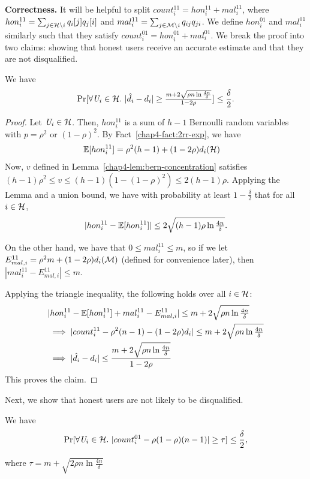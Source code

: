 \noindent \textbf{Correctness.} 
It will be helpful to split $count_i^{11} = hon_i^{11} + mal_i^{11}$, where $hon_i^{11} = \sum_{j \in \mathcal{H} \setminus i} q_{i}[j] q_{j}[i]$ and $mal_i^{11} = \sum_{j \in \mathcal{M} \setminus i} q_{ij} q_{ji}$. We define $hon_i^{01}$ and $mal_i^{01}$ similarly such that they satisfy $count_i^{01} = hon_i^{01} + mal_i^{01}$. We break the proof into two claims: showing that honest users receive an accurate estimate and that they are not disqualified.

\begin{claim}\label{chap4-claim:honest-response-concentration-1} We have
\[
    \Pr[\forall \textit{U}_i \in \mathcal{H}.~|\hat{d}_i - d_i| \geq \tfrac{m + 2 \sqrt{\rho n \ln \frac{4n}{\delta}}}{1-2\rho}] \leq \frac{\delta}{2}.
\]
\end{claim}
\begin{proof} 
Let $\textit{U}_i \in \mathcal{H}$. Then, $hon_i^{11}$ is a sum of $h-1$ Bernoulli random variables with $p = \rho^2$ or $(1-\rho)^2$. By Fact~\ref{chap4-fact:2rr-exp}, we have
\begin{align*}
    \operatorname{\mathbb{E}}[hon_i^{11}] &= \rho^2 (h-1) + (1-2\rho) d_i(\mathcal{H})
\end{align*}
Now, $v$ defined in Lemma~\ref{chap4-lem:bern-concentration} satisfies $(h-1) \rho^2 \leq v \leq (h-1)(1-(1-\rho)^2) \leq 2(h-1)\rho$. Applying the Lemma and a union bound, we have with probability at least $1-\frac{\delta}{2}$ that for all $i \in \mathcal{H}$,
\begin{equation}\label{chap4-eq:hon-player-bits}
    |hon_i^{11} - \operatorname{\mathbb{E}}[hon_i^{11}]| \leq 2\sqrt{(h-1)\rho \ln \tfrac{4n}{\delta}}.
\end{equation}

On the other hand, we have that $0 \leq mal_i^{11} \leq m$, so if we let $E_{mal,i}^{11} = \rho^2 m + (1-2\rho) d_i(\mathcal{M})$ (defined for convenience later), then $|mal_i^{11} - E_{mal,i}^{11}| \leq m$.

Applying the triangle inequality, the following holds over all $i \in \mathcal{H}$:
\begin{align*}
&|hon_i^{11} - \operatorname{\mathbb{E}}[hon_i^{11}] + mal_i^{11} - E_{mal,i}^{11}|
\leq m + 2\sqrt{ \rho n \ln \tfrac{4n}{\delta}} \\
& \implies |count_i^{11} - \rho^2 (n-1) - (1-2\rho) d_i| \leq m + 2\sqrt{ \rho n \ln \tfrac{4n}{\delta}} \\
& \implies |\hat{d}_i - d_i| \leq \frac{m + 2\sqrt{ \rho n \ln \tfrac{4n}{\delta}}}{1-2\rho}
\end{align*}
This proves the claim.
\end{proof}
Next, we show that honest users are not likely to be disqualified.
\begin{claim}\label{chap4-claim:honest-response-concentration-2} We have
\[
    \Pr[\forall \textit{U}_i \in \mathcal{H}.~|count_i^{01} - \rho(1-\rho)(n-1)| \geq \tau] \leq \frac{\delta}{2},
\]
\end{claim}
where $\tau = m + \sqrt{2 \rho n \ln \frac{4 n}{\delta}}$

